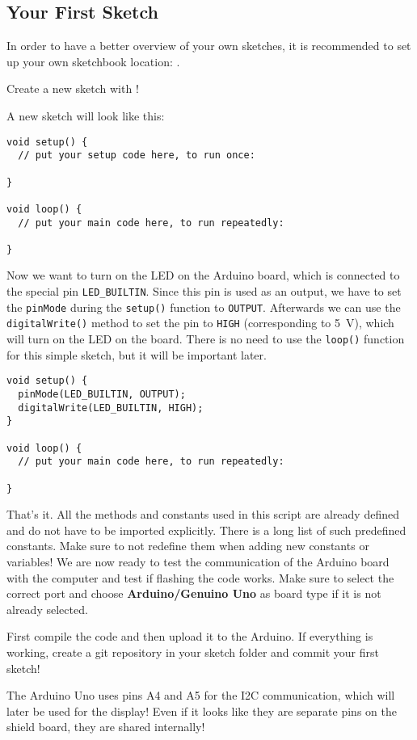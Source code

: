\subsection{Your First Sketch}
In order to have a better overview of your own sketches, it is recommended to set up your own sketchbook location: .
%
\begin{task}
  \item Create a new sketch with !
\end{task}
%
A new sketch will look like this:
\begin{verbatim}
void setup() {
  // put your setup code here, to run once:

}

void loop() {
  // put your main code here, to run repeatedly:

}
\end{verbatim}
%
Now we want to turn on the LED on the Arduino board, which is connected to the special pin \texttt{LED_BUILTIN}. Since this pin is used as an output, we have to set the \texttt{pinMode} during the \texttt{setup()} function to \texttt{OUTPUT}. Afterwards we can use the \texttt{digitalWrite()} method to set the pin to \texttt{HIGH} (corresponding to \SI{5}{\V}), which will turn on the LED on the board. There is no need to use the \texttt{loop()} function for this simple sketch, but it will be important later.
%
\begin{verbatim}
void setup() {
  pinMode(LED_BUILTIN, OUTPUT);
  digitalWrite(LED_BUILTIN, HIGH);
}

void loop() {
  // put your main code here, to run repeatedly:

}
\end{verbatim}
%
That's it. All the methods and constants used in this script are already defined and do not have to be imported explicitly. There is a long list of such predefined constants. Make sure to not redefine them when adding new constants or variables!
We are now ready to test the communication of the Arduino board with the computer and test if flashing the code works. Make sure to select the correct port and choose \textbf{Arduino/Genuino Uno} as board type if it is not already selected.
%
\begin{task}
  First compile the code and then upload it to the Arduino. If everything is working, create a git repository in your sketch folder and commit your first sketch!
\end{task}
%
\begin{note}
  The Arduino Uno uses pins A4 and A5 for the \ac{I2C} communication, which will later be used for the display! Even if it looks like they are separate pins on the shield board, they are shared internally!
\end{note}
%
